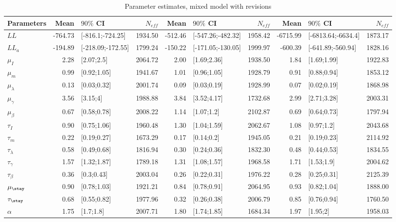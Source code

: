 \begin{table}

\caption{Parameter estimates, mixed model with revisions}
\centering
\begin{tabular}[t]{lrlrrlrrlr}
\toprule
Parameters & Mean & $90\%$ CI & $N_{eff}$ & Mean & $90\%$ CI & $N_{eff}$ & Mean & $90\%$ CI & $N_{eff}$\\
\midrule
$LL$ & -764.73 & {}[-816.1;-724.25] & 1934.50 & -512.46 & {}[-547.26;-482.32] & 1958.42 & -6715.99 & {}[-6813.64;-6634.4] & 1873.17\\
$LL_a$ & -194.89 & {}[-218.09;-172.55] & 1799.24 & -150.22 & {}[-171.05;-130.05] & 1999.97 & -600.39 & {}[-641.89;-560.94] & 1828.16\\
$\mu_I$ & 2.28 & {}[2.07;2.5] & 2064.72 & 2.00 & {}[1.69;2.36] & 1938.50 & 1.84 & {}[1.69;1.99] & 1922.83\\
$\mu_m$ & 0.99 & {}[0.92;1.05] & 1941.67 & 1.01 & {}[0.96;1.05] & 1928.79 & 0.91 & {}[0.88;0.94] & 1853.12\\
$\mu_\lambda$ & 0.13 & {}[0.03;0.32] & 2001.74 & 0.09 & {}[0.03;0.19] & 1928.99 & 0.07 & {}[0.02;0.19] & 1868.98\\
\addlinespace
$\mu_{\gamma}$ & 3.56 & {}[3.15;4] & 1988.88 & 3.84 & {}[3.52;4.17] & 1732.68 & 2.99 & {}[2.71;3.28] & 2003.31\\
$\mu_{\beta}$ & 0.67 & {}[0.58;0.78] & 2008.22 & 1.14 & {}[1.07;1.2] & 2102.87 & 0.69 & {}[0.64;0.73] & 1797.94\\
$\tau_I$ & 0.90 & {}[0.75;1.06] & 1960.48 & 1.30 & {}[1.04;1.59] & 2062.67 & 1.08 & {}[0.97;1.2] & 2043.68\\
$\tau_m$ & 0.22 & {}[0.19;0.27] & 1673.29 & 0.17 & {}[0.14;0.2] & 1945.05 & 0.21 & {}[0.19;0.23] & 2114.92\\
$\tau_{\lambda}$ & 0.58 & {}[0.49;0.68] & 1816.94 & 0.30 & {}[0.24;0.36] & 1832.30 & 0.48 & {}[0.44;0.53] & 1834.55\\
\addlinespace
$\tau_{\gamma}$ & 1.57 & {}[1.32;1.87] & 1789.18 & 1.31 & {}[1.08;1.57] & 1968.58 & 1.71 & {}[1.53;1.9] & 2004.62\\
$\tau_{\beta}$ & 0.36 & {}[0.3;0.43] & 2003.04 & 0.26 & {}[0.22;0.31] & 1976.22 & 0.28 & {}[0.25;0.31] & 2125.39\\
$\mu_{\stay}$ & 0.90 & {}[0.78;1.03] & 1921.21 & 0.84 & {}[0.78;0.91] & 2064.95 & 0.93 & {}[0.82;1.04] & 1888.00\\
$\tau_{\stay}$ & 0.68 & {}[0.55;0.82] & 1977.96 & 0.32 & {}[0.26;0.38] & 2006.79 & 0.85 & {}[0.76;0.94] & 1760.50\\
$\alpha$ & 1.75 & {}[1.7;1.8] & 2007.71 & 1.80 & {}[1.74;1.85] & 1684.34 & 1.97 & {}[1.95;2] & 1958.03\\
\bottomrule
\end{tabular}
\end{table}
